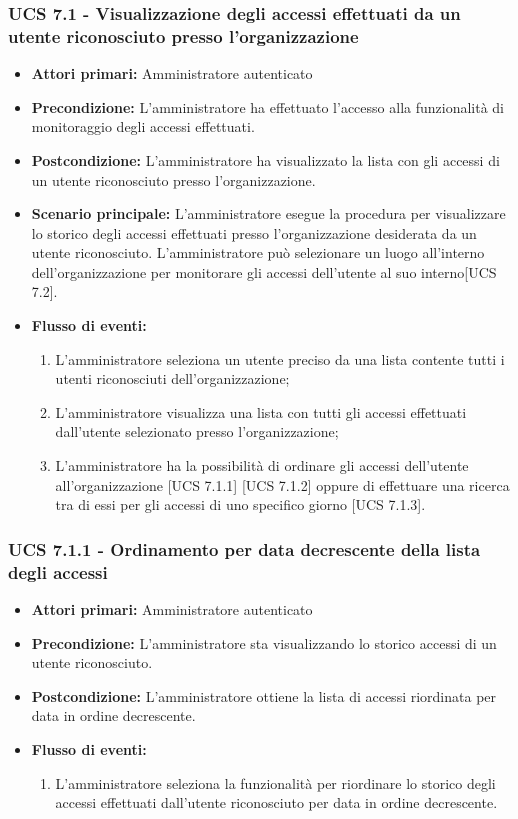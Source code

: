 \subsubsection{UCS 7.1 - Visualizzazione degli accessi effettuati da un utente riconosciuto presso l'organizzazione}
\begin{itemize}
	\item \textbf{Attori primari:} Amministratore autenticato
	\item \textbf{Precondizione:} L'amministratore ha effettuato l'accesso alla funzionalità di monitoraggio degli accessi effettuati.
	\item \textbf{Postcondizione:} L'amministratore ha visualizzato la lista con gli accessi di un utente riconosciuto presso l'organizzazione.
	\item \textbf{Scenario principale:} L'amministratore esegue la procedura per visualizzare lo storico degli accessi effettuati presso l'organizzazione desiderata da un utente riconosciuto.
	L'amministratore può selezionare un luogo all'interno dell'organizzazione per monitorare gli accessi dell'utente al suo interno[UCS 7.2].
	\item \textbf{Flusso di eventi:}
	\begin{enumerate}
	\item L'amministratore seleziona un utente preciso da una lista contente tutti i utenti riconosciuti dell'organizzazione;
	\item L'amministratore visualizza una lista con tutti gli accessi effettuati dall'utente selezionato presso l'organizzazione;
	\item L'amministratore ha la possibilità di ordinare gli accessi dell'utente all'organizzazione [UCS 7.1.1] [UCS 7.1.2] oppure di effettuare una ricerca tra di essi per gli accessi di uno specifico giorno [UCS 7.1.3].
	\end{enumerate}
\end{itemize}

\subsubsection{UCS 7.1.1 - Ordinamento per data decrescente della lista degli accessi}
\begin{itemize}
	\item \textbf{Attori primari:} Amministratore autenticato
	\item \textbf{Precondizione:} L'amministratore sta visualizzando lo storico accessi di un utente riconosciuto.
	\item \textbf{Postcondizione:} L'amministratore ottiene la lista di accessi riordinata per data in ordine decrescente.
	\item \textbf{Flusso di eventi:}
	\begin{enumerate}
		\item L'amministratore seleziona la funzionalità per riordinare lo storico degli accessi effettuati dall'utente riconosciuto per data in ordine decrescente.
	\end{enumerate}   
\end{itemize}

